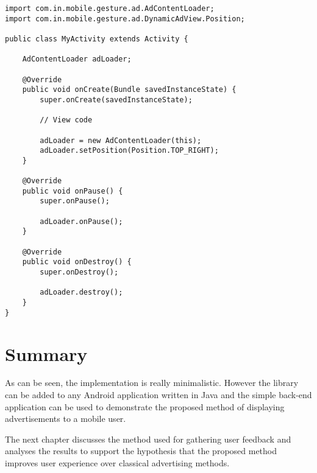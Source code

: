 \lstset{language=Java}

\begin{lstlisting}
import com.in.mobile.gesture.ad.AdContentLoader;
import com.in.mobile.gesture.ad.DynamicAdView.Position;

public class MyActivity extends Activity {

    AdContentLoader adLoader;

    @Override
    public void onCreate(Bundle savedInstanceState) {
        super.onCreate(savedInstanceState);

        // View code

        adLoader = new AdContentLoader(this);
        adLoader.setPosition(Position.TOP_RIGHT);
    }

    @Override
    public void onPause() {
        super.onPause();

        adLoader.onPause();
    }

    @Override
    public void onDestroy() {
        super.onDestroy();

        adLoader.destroy();
    }
}
\end{lstlisting}

\section{Summary}

As can be seen, the implementation is really minimalistic. However the library can be added to any Android application written in Java and the simple back-end application can be used to demonstrate the proposed method of displaying advertisements to a mobile user.

The next chapter discusses the method used for gathering user feedback and analyses the results to support the hypothesis that the proposed method improves user experience over classical advertising methods.